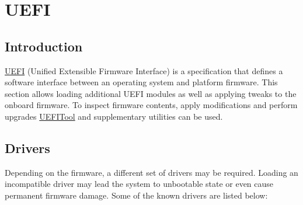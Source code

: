 \documentclass[]{article}
\begin{document}
\section{UEFI}\label{uefi}

\subsection{Introduction}\label{uefiintro}

\href{https://uefi.org/specifications}{UEFI} (Unified Extensible Firmware Interface)
is a specification that defines a software interface between an operating system and
platform firmware. This section allows loading additional UEFI modules as well as applying
tweaks to the onboard firmware. To inspect firmware contents, apply modifications
and perform upgrades \href{https://github.com/LongSoft/UEFITool/releases}{UEFITool}
and supplementary utilities can be used.

\subsection{Drivers}\label{uefidrivers}

Depending on the firmware, a different set of drivers may be required.
Loading an incompatible driver may lead the system to unbootable state or
even cause permanent firmware damage. Some of the known drivers are listed below:
\end{document}
